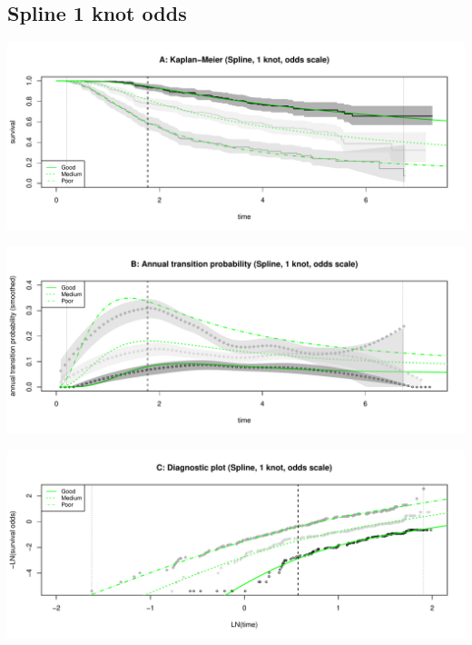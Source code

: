 \documentclass[]{article}
\begin{document}
\newpage

\subsection{Spline 1 knot odds}\label{spline-1-knot-odds}

\begin{flushleft}\includegraphics[height=0.25\textheight]{Images/spline_odds1-1} \end{flushleft}

\begin{flushleft}\includegraphics[height=0.25\textheight]{Images/spline_odds1-2} \end{flushleft}

\begin{flushleft}\includegraphics[height=0.25\textheight]{Images/spline_odds1-3} \end{flushleft}

\newpage
\end{document}
